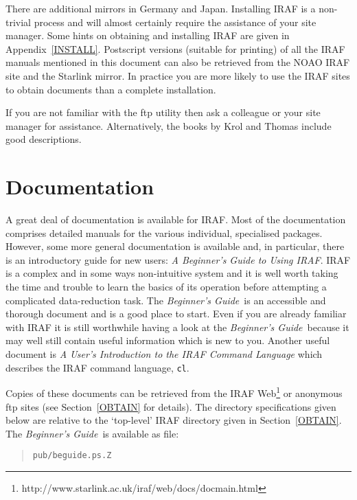 \documentclass[twoside,11pt]{article}
\newcommand{\htmladdnormallinkfoot}[2]{#1\footnote{#2}}
\newcommand{\htmladdnormallink}[2]{#1}
\newcommand{\xlabel}[1]{}
\begin{document}
There are additional mirrors in Germany and Japan.
Installing IRAF is a non-trivial process and will almost certainly
require the assistance of your site manager.  Some hints on obtaining
and installing IRAF are given in Appendix~\ref{INSTALL}.  Postscript
versions (suitable for printing) of all the IRAF manuals mentioned in
this document can also be retrieved from the NOAO IRAF site and the
Starlink mirror.  In practice you are more likely to use the IRAF sites
to obtain documents than a complete installation.

If you are not familiar with the ftp utility then ask a colleague or
your site manager for assistance.  Alternatively, the books by
Krol\cite{KROL92} and Thomas\cite{THOMAS95} include good descriptions.


\section{\xlabel{DOC}\label{DOC}Documentation}

A great deal of \htmladdnormallink{documentation}
{http://iraf.noao.edu/iraf/web/docs/docmain.html}
is available for IRAF.  Most of the
documentation comprises detailed manuals for the various individual,
specialised packages.  However, some more general documentation is
available and, in particular, there is an introductory guide for new
users: {\it A Beginner's Guide to Using IRAF}\/\cite{BARNES93}.
IRAF is a complex and in some ways non-intuitive system and it is well
worth taking the time and trouble to learn the basics of its operation
before attempting a complicated data-reduction task.  The {\it
Beginner's Guide}\, is an accessible and thorough document and is a good
place to start.  Even if you are already familiar with IRAF it is still
worthwhile having a look at the {\it Beginner's Guide}\, because it may
well still contain useful information which is new to you.  Another
useful document is {\it A User's Introduction to the IRAF Command
Language}\/\cite{SHAMES86} which describes the IRAF command language,
{\tt cl}.

Copies of these documents can be retrieved from the IRAF 
\htmladdnormallinkfoot{Web}
{http://www.starlink.ac.uk/iraf/web/docs/docmain.html}
or anonymous ftp sites (see Section~\ref{OBTAIN} for details).  The
directory specifications given below are relative to the `top-level' IRAF
directory given in Section~\ref{OBTAIN}.  The {\it Beginner's Guide}\, is
available as file:

\begin{quote}
{\tt pub/beguide.ps.Z}
\end{quote}
\end{document}
